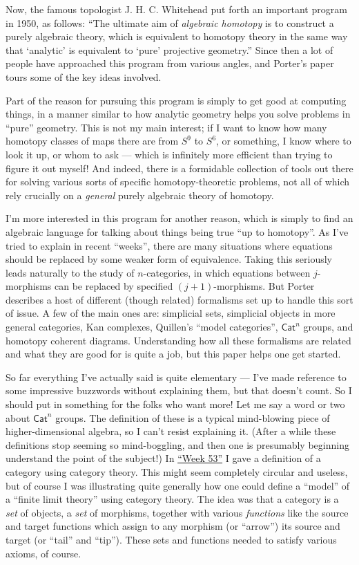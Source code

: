 \documentclass{article}
\begin{document}
Now, the famous topologist J. H. C. Whitehead put forth an important
program in 1950, as follows: ``The ultimate aim of \emph{algebraic
homotopy} is to construct a purely algebraic theory, which is equivalent
to homotopy theory in the same way that `analytic' is equivalent to
`pure' projective geometry.'' Since then a lot of people have approached
this program from various angles, and Porter's paper tours some of the
key ideas involved.

Part of the reason for pursuing this program is simply to get good at
computing things, in a manner similar to how analytic geometry helps you
solve problems in ``pure'' geometry. This is not my main interest; if I
want to know how many homotopy classes of maps there are from \(S^9\) to
\(S^6\), or something, I know where to look it up, or whom to ask ---
which is infinitely more efficient than trying to figure it out myself!
And indeed, there is a formidable collection of tools out there for
solving various sorts of specific homotopy-theoretic problems, not all
of which rely crucially on a \emph{general} purely algebraic theory of
homotopy.

I'm more interested in this program for another reason, which is simply
to find an algebraic language for talking about things being true ``up
to homotopy''. As I've tried to explain in recent ``weeks'', there are
many situations where equations should be replaced by some weaker form
of equivalence. Taking this seriously leads naturally to the study of
\(n\)-categories, in which equations between \(j\)-morphisms can be
replaced by specified \((j+1)\)-morphisms. But Porter describes a host
of different (though related) formalisms set up to handle this sort of
issue. A few of the main ones are: simplicial sets, simplicial objects
in more general categories, Kan complexes, Quillen's ``model
categories'', \(\mathsf{Cat}^n\) groups, and homotopy coherent diagrams.
Understanding how all these formalisms are related and what they are
good for is quite a job, but this paper helps one get started.

So far everything I've actually said is quite elementary --- I've made
reference to some impressive buzzwords without explaining them, but that
doesn't count. So I should put in something for the folks who want more!
Let me say a word or two about \(\mathsf{Cat}^n\) groups. The definition
of these is a typical mind-blowing piece of higher-dimensional algebra,
so I can't resist explaining it. (After a while these definitions stop
seeming so mind-boggling, and then one is presumably beginning
understand the point of the subject!) In
\protect\hyperlink{week53}{``Week 53''} I gave a definition of a
category using category theory. This might seem completely circular and
useless, but of course I was illustrating quite generally how one could
define a ``model'' of a ``finite limit theory'' using category theory.
The idea was that a category is a \emph{set} of objects, a \emph{set} of
morphisms, together with various \emph{functions} like the source and
target functions which assign to any morphism (or ``arrow'') its source
and target (or ``tail'' and ``tip''). These sets and functions needed to
satisfy various axioms, of course.
\end{document}
